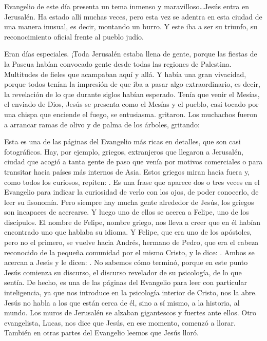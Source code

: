
\begin{body}
[\ldots]


 Evangelio de este día presenta un tema inmenso y maravilloso\ldots Jesús entra en Jerusalén. Ha estado allí muchas veces, pero esta vez se adentra en esta ciudad de una manera inusual, es decir, montando un burro. Y este iba a ser su triunfo, su reconocimiento oficial frente al pueblo judío.

Eran días especiales. ¡Toda Jerusalén estaba llena de gente, porque las fiestas de la Pascua habían convocado gente desde todas las regiones de Palestina. Multitudes de fieles que acampaban aquí y allá. Y había una gran vivacidad, porque todos tenían la impresión de que iba a pasar algo extraordinario, es decir, la revelación de lo que durante siglos habían esperado. Tenía que venir el Mesías, el enviado de Dios, Jesús se presenta como el Mesías y el pueblo, casi tocado por una chispa que enciende el fuego, se entusiasma.  gritaron. Los muchachos fueron a arrancar ramas de olivo y de palma de los árboles, gritando: 

Esta es una de las páginas del Evangelio más ricas en detalles, que son casi fotográficos. Hay, por ejemplo, griegos, extranjeros que llegaron a Jerusalén, ciudad que acogió a tanta gente de paso que venía por motivos comerciales o para transitar hacia países más internos de Asia. Estos griegos miran hacia fuera y, como todos los curiosos, repiten: . Es una frase que aparece dos o tres veces en el Evangelio para indicar la curiosidad de verlo con los ojos, de poder conocerlo, de leer su fisonomía. Pero siempre hay mucha gente alrededor de Jesús, los griegos son incapaces de acercarse. Y luego uno de ellos se acerca a Felipe, uno de los discípulos. El nombre de Felipe, nombre griego, nos lleva a creer que en él habían encontrado uno que hablaba su idioma. Y Felipe, que era uno de los apóstoles, pero no el primero, se vuelve hacia Andrés, hermano de Pedro, que era el cabeza reconocido de la pequeña comunidad por el mismo Cristo, y le dice: . Ambos se acercan a Jesús y le dicen: . No sabemos cómo terminó, porque en este punto Jesús comienza su discurso, el discurso revelador de su psicología, de lo que sentía. De hecho, es una de las páginas del Evangelio para leer con particular inteligencia, ya que nos introduce en la psicología interior de Cristo, nos la abre. Jesús no habla a los que están cerca de él, sino a sí mismo, a la historia, al mundo. Los muros de Jerusalén se alzaban gigantescos y fuertes ante ellos. Otro evangelista, Lucas, nos dice que Jesús, en ese momento, comenzó a llorar. También en otras partes del Evangelio leemos que Jesús lloró.


\end{body}
